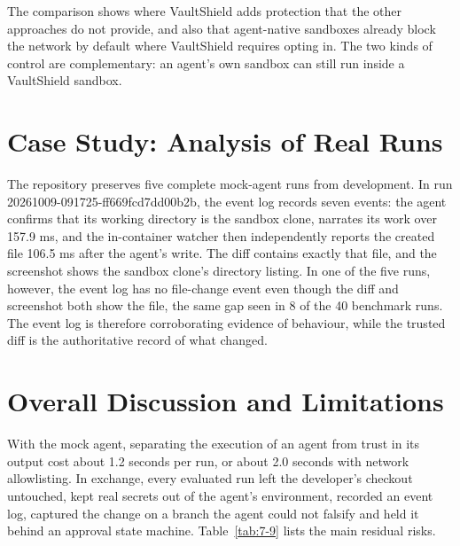 \documentclass[12pt,a4paper,oneside]{report}
\begin{document}
The comparison shows where VaultShield adds protection that the other approaches do not provide, and also that agent-native sandboxes already block the network by default where VaultShield requires opting in. The two kinds of control are complementary: an agent's own sandbox can still run inside a VaultShield sandbox.

\section{Case Study: Analysis of Real Runs}\label{case-study-analysis-of-real-runs}

The repository preserves five complete mock-agent runs from development. In run 20261009-091725-ff669fcd7dd00b2b, the event log records seven events: the agent confirms that its working directory is the sandbox clone, narrates its work over 157.9 ms, and the in-container watcher then independently reports the created file 106.5 ms after the agent's write. The diff contains exactly that file, and the screenshot shows the sandbox clone's directory listing. In one of the five runs, however, the event log has no file-change event even though the diff and screenshot both show the file, the same gap seen in 8 of the 40 benchmark runs. The event log is therefore corroborating evidence of behaviour, while the trusted diff is the authoritative record of what changed.

\section{Overall Discussion and Limitations}\label{discussion-and-limitations}

With the mock agent, separating the execution of an agent from trust in its output cost about 1.2 seconds per run, or about 2.0 seconds with network allowlisting. In exchange, every evaluated run left the developer's checkout untouched, kept real secrets out of the agent's environment, recorded an event log, captured the change on a branch the agent could not falsify and held it behind an approval state machine. Table~\ref{tab:7-9} lists the main residual risks.

\begingroup\small
\end{document}
